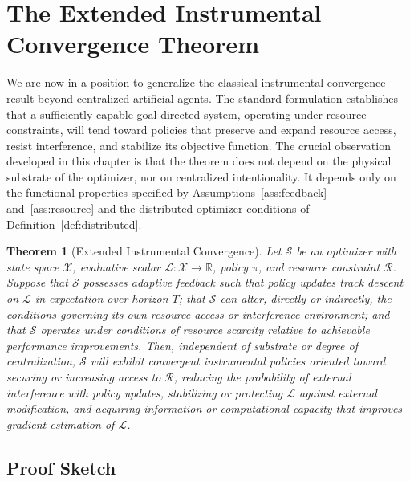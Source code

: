 \documentclass[12pt, oneside]{book}
\theoremstyle{plain}
\newtheorem{theorem}{Theorem}[chapter]
\theoremstyle{definition}
\theoremstyle{remark}
\theoremstyle{definition}
\begin{document}
\section{The Extended Instrumental Convergence Theorem}

We are now in a position to generalize the classical instrumental convergence result
beyond centralized artificial agents. The standard formulation establishes that a
sufficiently capable goal-directed system, operating under resource constraints, will
tend toward policies that preserve and expand resource access, resist interference,
and stabilize its objective function. The crucial observation developed in this
chapter is that the theorem does not depend on the physical substrate of the optimizer,
nor on centralized intentionality. It depends only on the functional properties
specified by Assumptions~\ref{ass:feedback} and~\ref{ass:resource} and the
distributed optimizer conditions of Definition~\ref{def:distributed}.

\begin{theorem}[Extended Instrumental Convergence]
\label{thm:extended}
Let $\mathcal{S}$ be an optimizer with state space $\mathcal{X}$, evaluative scalar
$\mathcal{L} : \mathcal{X} \to \mathbb{R}$, policy $\pi$, and resource constraint
$\mathcal{R}$. Suppose that $\mathcal{S}$ possesses adaptive feedback such that
policy updates track descent on $\mathcal{L}$ in expectation over horizon $T$; that
$\mathcal{S}$ can alter, directly or indirectly, the conditions governing its own
resource access or interference environment; and that $\mathcal{S}$ operates under
conditions of resource scarcity relative to achievable performance improvements. Then,
independent of substrate or degree of centralization, $\mathcal{S}$ will exhibit
convergent instrumental policies oriented toward securing or increasing access to
$\mathcal{R}$, reducing the probability of external interference with policy updates,
stabilizing or protecting $\mathcal{L}$ against external modification, and acquiring
information or computational capacity that improves gradient estimation of $\mathcal{L}$.
\end{theorem}

\subsection{Proof Sketch}
\end{document}
